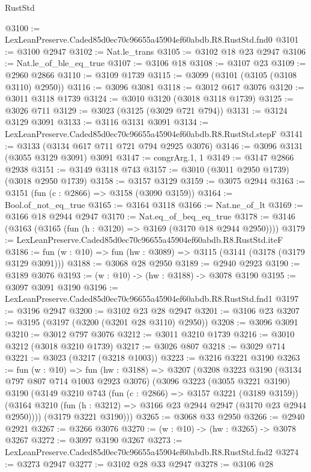 \begin{lexlean}{RustStd}
\begin{coremodule}
@3100 := LexLeanPreserve.Caded85d0ec70c96655a45904ef60abdb.R8.RustStd.fnd0
@3101 := @3100 @2947
@3102 := Nat.le_trans
@3105 := @3102 @18 @23 @2947
@3106 := Nat.le_of_ble_eq_true
@3107 := @3106 @18
@3108 := @3107 @23
@3109 := @2960 @2866
@3110 := @3109 @1739
@3115 := @3099 (@3101 (@3105 (@3108 @3110) @2950))
@3116 := @3096 @3081
@3118 := @3012 @617 @3076
@3120 := @3011 @3118 @1739
@3124 := @3010 @3120 (@3018 @3118 @1739)
@3125 := @3026 @711
@3129 := @3023 (@3125 (@3029 @721 @794))
@3131 := @3124 @3129 @3091
@3133 := @3116 @3131 @3091
@3134 := LexLeanPreserve.Caded85d0ec70c96655a45904ef60abdb.R8.RustStd.stepF
@3141 := @3133 (@3134 @617 @711 @721 @794 @2925 @3076)
@3146 := @3096 @3131 (@3055 @3129 @3091) @3091
@3147 := congrArg.{1, 1}
@3149 := @3147 @2866 @2938
@3151 := @3149 @3118 @743
@3157 := @3010 (@3011 @2950 @1739) (@3018 @2950 @1739)
@3158 := @3157 @3129
@3159 := @3075 @2944
@3163 := @3151 (fun (c : @2866) => @3158 (@3090 @3159))
@3164 := Bool.of_not_eq_true
@3165 := @3164 @3118
@3166 := Nat.ne_of_lt
@3169 := @3166 @18 @2944 @2947
@3170 := Nat.eq_of_beq_eq_true
@3178 := @3146 (@3163 (@3165 (fun (h : @3120) => @3169 (@3170 @18 @2944 @2950))))
@3179 := LexLeanPreserve.Caded85d0ec70c96655a45904ef60abdb.R8.RustStd.iteF
@3186 := fun (w : @10) => fun (hw : @3089) => @3115 (@3141 (@3178 (@3179 @3129 @3091)))
@3188 := @3068 @28 @2950
@3189 := @2940 @2923
@3190 := @3189 @3076
@3193 := (w : @10) -> (hw : @3188) -> @3078 @3190
@3195 := @3097 @3091 @3190
@3196 := LexLeanPreserve.Caded85d0ec70c96655a45904ef60abdb.R8.RustStd.fnd1
@3197 := @3196 @2947
@3200 := @3102 @23 @28 @2947
@3201 := @3106 @23
@3207 := @3195 (@3197 (@3200 (@3201 @28 @3110) @2950))
@3208 := @3096 @3091
@3210 := @3012 @797 @3076
@3212 := @3011 @3210 @1739
@3216 := @3010 @3212 (@3018 @3210 @1739)
@3217 := @3026 @807
@3218 := @3029 @714
@3221 := @3023 (@3217 (@3218 @1003))
@3223 := @3216 @3221 @3190
@3263 := fun (w : @10) =>
  fun (hw : @3188) =>
  @3207
    (@3208
      @3223
      @3190
      (@3134 @797 @807 @714 @1003 @2923 @3076)
      (@3096
        @3223
        (@3055 @3221 @3190)
        @3190
        (@3149
          @3210
          @743
          (fun (c : @2866) => @3157 @3221 (@3189 @3159))
          (@3164 @3210 (fun (h : @3212) => @3166 @23 @2944 @2947 (@3170 @23 @2944 @2950))))
        (@3179 @3221 @3190)))
@3265 := @3068 @33 @2950
@3266 := @2940 @2921
@3267 := @3266 @3076
@3270 := (w : @10) -> (hw : @3265) -> @3078 @3267
@3272 := @3097 @3190 @3267
@3273 := LexLeanPreserve.Caded85d0ec70c96655a45904ef60abdb.R8.RustStd.fnd2
@3274 := @3273 @2947
@3277 := @3102 @28 @33 @2947
@3278 := @3106 @28

\end{coremodule}
\end{lexlean}
